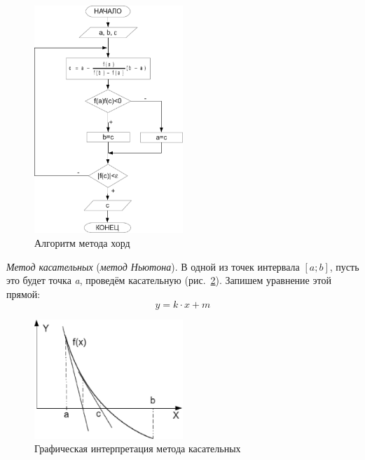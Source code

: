 \begin{figure}[htb]
\begin{center}
\includegraphics[width=0.5\textwidth]{img/ris_4_6}
\caption{Алгоритм метода хорд}
\label{ch04:refDrawing5}
\end{center}
\end{figure}

\emph{Метод касательных} (\emph{метод Ньютона}). В одной из точек интервала  $[a;b]$, пусть
это будет точка \emph{a}, проведём касательную (рис.~\ref{ch04:refDrawing6}). Запишем уравнение этой прямой:
\begin{equation}\label{ch04:refDrawing6a}
y=k\cdot x+m
\end{equation}

\begin{figure}[htb]
\begin{center}
\includegraphics[width=0.5\textwidth]{img/ris_4_7}
\caption{Графическая интерпретация метода касательных}
\label{ch04:refDrawing6}
\end{center}
\end{figure}

